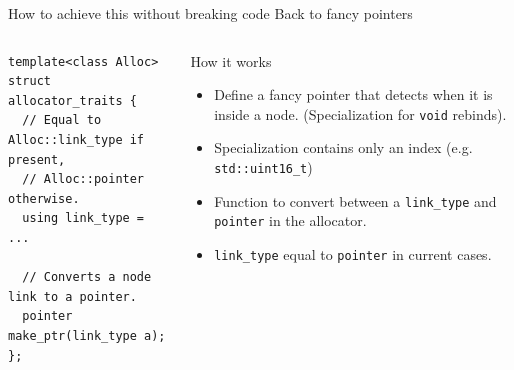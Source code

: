 \documentclass[10pt,aspectratio=169]{beamer}
\begin{document}
\begin{frame}[fragile]
{How to achieve this without breaking code}
{Back to fancy pointers}

\begin{columns}
\begin{column}{0.47\textwidth}
\begin{lstlisting}
template<class Alloc>
struct allocator_traits {
  // Equal to Alloc::link_type if present,
  // Alloc::pointer otherwise.
  using link_type = ...

  // Converts a node link to a pointer.
  pointer make_ptr(link_type a);
};
\end{lstlisting}
\end{column}

\begin{column}{0.47\textwidth}
\begin{block}{How it works}
\begin{itemize}
\item Define a fancy pointer that detects when
it is inside a node. (Specialization for \texttt{void}
rebinds).
\item Specialization contains
only an index (e.g. \texttt{std::uint16\_t})
\item Function to convert between a \texttt{link\_type}
and \texttt{pointer} in the allocator.
\item \texttt{link\_type} equal to \texttt{pointer}
in current cases.
\end{itemize}
\end{block}
\end{column}

\end{columns}

\end{frame}
\end{document}
